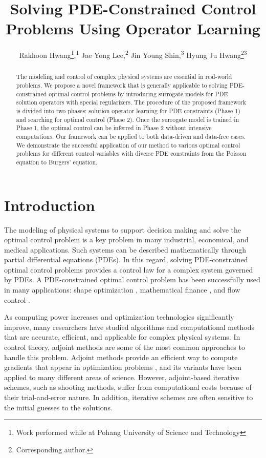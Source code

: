 \documentclass[letterpaper]{article}
\title{Solving PDE-Constrained Control Problems Using Operator Learning}
\author{
    Rakhoon Hwang\equalcontrib\thanks{Work performed while at Pohang University of Science and
Technology},\textsuperscript{\rm 1} 
    Jae Yong Lee\equalcontrib\footnotemark[2],\textsuperscript{\rm 2}
    Jin Young Shin\equalcontrib,\textsuperscript{\rm 3} 
    Hyung Ju Hwang\thanks{Corresponding author.}\textsuperscript{\rm 3}
}
\begin{document}
\maketitle

\begin{abstract}
The modeling and control of complex physical systems are essential in real-world problems. We propose a novel framework that is generally applicable to solving PDE-constrained optimal control problems by introducing surrogate models for PDE solution operators with special regularizers. The procedure of the proposed framework is divided into two phases: solution operator learning for PDE constraints (Phase 1) and searching for optimal control (Phase 2). Once the surrogate model is trained in Phase 1, the optimal control can be inferred in Phase 2 without intensive computations. Our framework can be applied to both data-driven and data-free cases. We demonstrate the successful application of our method to various optimal control problems for different control variables with diverse PDE constraints from the Poisson equation to Burgers' equation.
\end{abstract}

\section*{Introduction} \label{intro}
\noindent The modeling of physical systems to support decision making and solve the optimal control problem is a key problem in many industrial, economical, and medical applications. Such systems can be described mathematically through partial differential equations (PDEs). In this regard, solving PDE-constrained optimal control problems provides a control law for a complex system governed by PDEs. A PDE-constrained optimal control problem has been successfully used in many applications: shape optimization \cite{haslinger2003introduction,sokolowski1992introduction}, mathematical finance \cite{bouchouev1999uniqueness,egger2005tikhonov}, and flow control \cite{gunzburger2002perspectives}. 

As computing power increases and optimization technologies significantly improve, many researchers have studied algorithms and computational methods that are accurate, efficient, and applicable for complex physical systems. In control theory, adjoint methods are some of the most common approaches to handle this problem. Adjoint methods provide an efficient way to compute gradients that appear in optimization problems \citep{lions1971optimal, pironneau1974optimum, troltzsch2010optimal}, and its variants have been applied to many different areas of science. However, adjoint-based iterative schemes, such as shooting methods, suffer from computational costs because of their trial-and-error nature. In addition, iterative schemes are often sensitive to the initial guesses to the solutions.
\end{document}
